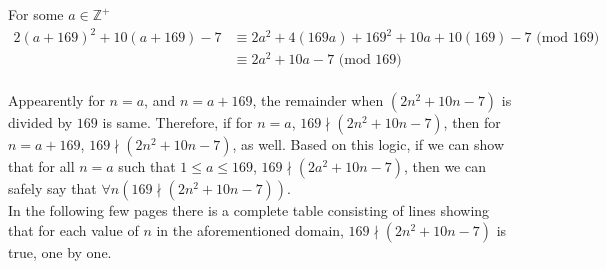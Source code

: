 \documentclass[12pt]{article}
\begin{document}
For some $a \in \mathbb{Z^+}$
\begin{align*}
	2(a+169)^2 + 10(a+169) - 7 &\equiv 2a^2 + 4(169a) + 169^2 + 10a + 10(169) -7 \text{ (mod $169$)}\\
	&\equiv 2a^2 + 10a -7\text{ (mod $169$)}\\
\end{align*}

Appearently for $n=a$, and $n=a+169$, the remainder when $(2n^2+10n-7)$ is divided by $169$ is same. Therefore, if for $n=a$, $169 \nmid (2n^2+10n-7)$, then for $n=a+169$, $169 \nmid (2n^2+10n-7)$, as well. Based on this logic, if we can show that for all $n=a$ such that $1\leq a\leq 169$, $169 \nmid (2a^2+10n-7)$, then we can safely say that $\forall n(169 \nmid (2n^2+10n-7))$.\\

In the following few pages there is a complete table consisting of lines showing that for each value of $n$ in the aforementioned domain, $169 \nmid (2n^2 + 10n -7)$ is true, one by one.\\
	
\end{document}

